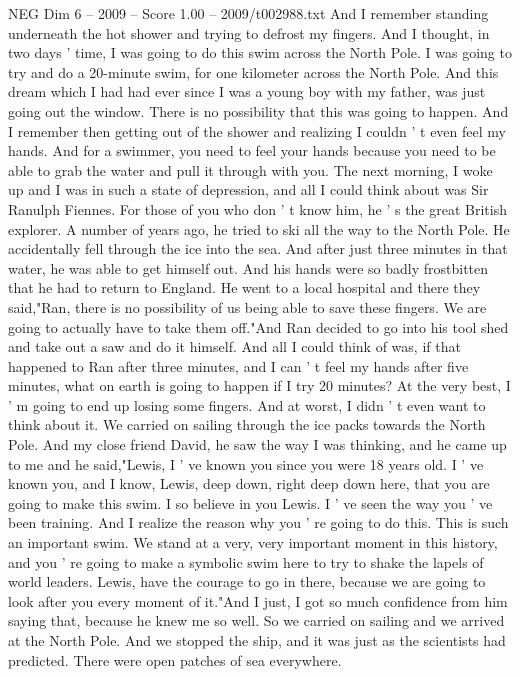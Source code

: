 \begin{textsample}{NEG Dim 6 – 2009 – Score 1.00 – 2009/t002988.txt}
And I remember standing underneath the hot shower and trying to defrost my fingers.
And I thought, in two days ' time, I was going to do this swim across the North Pole.
I was going to try and do a 20-minute swim, for one kilometer across the North Pole.
And this dream which I had had ever since I was a young boy with my father, was just going out the window.
There is no possibility that this was going to happen.
And I remember then getting out of the shower and realizing I couldn ' t even feel my hands.
And for a swimmer, you need to feel your hands because you need to be able to grab the water and pull it through with you.
The next morning, I woke up and I was in such a state of depression, and all I could think about was Sir Ranulph Fiennes.
For those of you who don ' t know him, he ' s the great British explorer.
A number of years ago, he tried to ski all the way to the North Pole.
He accidentally fell through the ice into the sea.
And after just three minutes in that water, he was able to get himself out.
And his hands were so badly frostbitten that he had to return to England.
He went to a local hospital and there they said,"Ran, there is no possibility of us being able to save these fingers.
We are going to actually have to take them off."And Ran decided to go into his tool shed and take out a saw and do it himself.
And all I could think of was, if that happened to Ran after three minutes, and I can ' t feel my hands after five minutes, what on earth is going to happen if I try 20 minutes?
At the very best, I ' m going to end up losing some fingers.
And at worst, I didn ' t even want to think about it.
We carried on sailing through the ice packs towards the North Pole.
And my close friend David, he saw the way I was thinking, and he came up to me and he said,"Lewis, I ' ve known you since you were 18 years old.
I ' ve known you, and I know, Lewis, deep down, right deep down here, that you are going to make this swim.
I so believe in you Lewis.
I ' ve seen the way you ' ve been training.
And I realize the reason why you ' re going to do this.
This is such an important swim.
We stand at a very, very important moment in this history, and you ' re going to make a symbolic swim here to try to shake the lapels of world leaders.
Lewis, have the courage to go in there, because we are going to look after you every moment of it."And I just, I got so much confidence from him saying that, because he knew me so well.
So we carried on sailing and we arrived at the North Pole.
And we stopped the ship, and it was just as the scientists had predicted.
There were open patches of sea everywhere.

\end{textsample}
